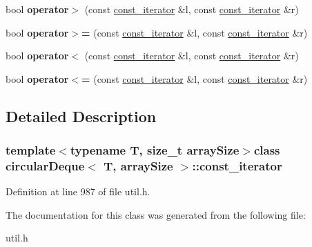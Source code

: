 \begin{DoxyCompactItemize}
\item 
\hypertarget{classcircularDeque_1_1const__iterator_ae3fcb1c6db8f72c42e0830aa4d8a5bd9}{bool {\bfseries operator$>$} (const \hyperlink{classcircularDeque_1_1const__iterator}{const\+\_\+iterator} \&l, const \hyperlink{classcircularDeque_1_1const__iterator}{const\+\_\+iterator} \&r)}\label{classcircularDeque_1_1const__iterator_ae3fcb1c6db8f72c42e0830aa4d8a5bd9}

\item 
\hypertarget{classcircularDeque_1_1const__iterator_ab9e286a09c563b3cc6464fce11884a0e}{bool {\bfseries operator$>$=} (const \hyperlink{classcircularDeque_1_1const__iterator}{const\+\_\+iterator} \&l, const \hyperlink{classcircularDeque_1_1const__iterator}{const\+\_\+iterator} \&r)}\label{classcircularDeque_1_1const__iterator_ab9e286a09c563b3cc6464fce11884a0e}

\item 
\hypertarget{classcircularDeque_1_1const__iterator_a0ff653fe6b36c48d70e1d4fd88fb80c7}{bool {\bfseries operator$<$} (const \hyperlink{classcircularDeque_1_1const__iterator}{const\+\_\+iterator} \&l, const \hyperlink{classcircularDeque_1_1const__iterator}{const\+\_\+iterator} \&r)}\label{classcircularDeque_1_1const__iterator_a0ff653fe6b36c48d70e1d4fd88fb80c7}

\item 
\hypertarget{classcircularDeque_1_1const__iterator_a9bfb32fe108f74ef4d6d9ef242ef9751}{bool {\bfseries operator$<$=} (const \hyperlink{classcircularDeque_1_1const__iterator}{const\+\_\+iterator} \&l, const \hyperlink{classcircularDeque_1_1const__iterator}{const\+\_\+iterator} \&r)}\label{classcircularDeque_1_1const__iterator_a9bfb32fe108f74ef4d6d9ef242ef9751}

\end{DoxyCompactItemize}


\subsection{Detailed Description}
\subsubsection*{template$<$typename T, size\+\_\+t array\+Size$>$class circular\+Deque$<$ T, array\+Size $>$\+::const\+\_\+iterator}



Definition at line 987 of file util.\+h.



The documentation for this class was generated from the following file\+:\begin{DoxyCompactItemize}
\item 
util.\+h\end{DoxyCompactItemize}
